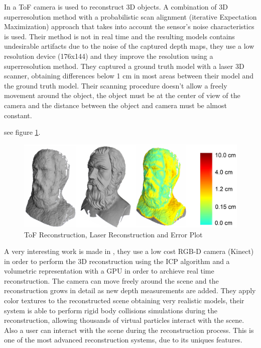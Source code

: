 In \cite{cui} a ToF camera is used to reconstruct 3D objects. A combination of 3D superresolution method with a 
probabilistic scan alignment (iterative Expectation Maximization) approach that takes into account the sensor's 
noise characteristics is used. Their method is not in real time and the resulting models contains undesirable 
artifacts due to  the noise of the captured depth maps, they use a low resolution device (176x144) and they 
improve the resolution using a superresolution method. They captured a ground truth model with a laser 3D scanner, 
obtaining differences below 1 cm in most areas between their model and the ground truth model. Their scanning 
procedure doesn't allow a freely movement around the object, the object must be at the center of view of the camera 
and the distance between the object and camera must be almost constant.
 
see figure \ref{fig:cui}.

\begin{figure}[h!]
\begin{center}
\includegraphics[scale=0.23]{images/cui}
\caption{ToF Reconstruction, Laser Reconstruction and Error Plot}
\label{fig:cui}
\end{center}
\end{figure}

 
A very interesting work is made in \cite{izadi}, they use a low cost RGB-D camera (Kinect) in order to perform
the 3D reconstruction using the ICP algorithm  and a volumetric representation with a GPU in order to 
archieve real time reconstruction. The camera can move freely around the scene and the reconstruction grows in detail 
as new depth measurements are added. They apply color textures to the reconstructed scene obtaining very 
realistic models, their system is able to perform rigid body collisions 
simulations during the reconstruction, allowing thousands of virtual particles interact with the scene. Also a 
user can interact with the scene during the reconstruction process. This is one of the most advanced 
reconstruction systems, due to its uniques features.

